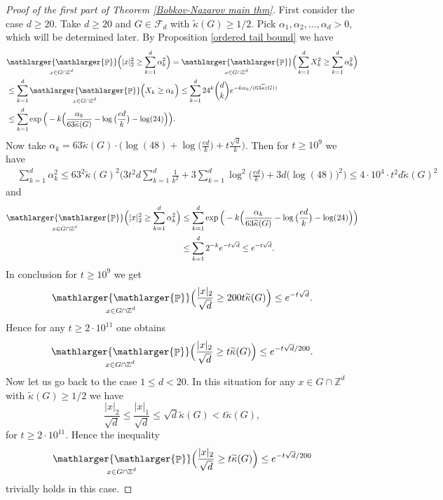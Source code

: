 \documentclass[a4paper,oneside, reqno]{amsart}
\numberwithin{equation}{section}
\theoremstyle{definition}%
\theoremstyle{definition}
\theoremstyle{definition}%
\theoremstyle{definition}
\newcommand{\Pro}{\mathop{\mathbb{P}}}
\newcommand{\Z}{\mathbb{Z}}
\newcommand{\spr}[1]{\underset{_{\substack{#1}}}{\mathlarger{\mathlarger{\Pro}}}}
\begin{document}
\begin{proof}[Proof of the first part of Theorem \ref{Bobkov-Nazarov main thm}]
First consider the case $d \ge 20$.
Take $d \ge 20$ and $G \in \mathcal{F}_d$ with $\widetilde{\kappa}(G) \ge 1/2$. Pick $\alpha_1,\alpha_2,\ldots, \alpha_d >0$, which will be determined later. By Proposition \ref{ordered tail bound} we have 
\begin{align*}
    &\spr{x \in G \cap \Z^d} \Big( |x|_2^2 \ge \sum_{k=1}^d \alpha_k^2 \Big)=\spr{x \in G \cap \Z^d} \Big(\sum_{k=1}^d X_k^2 \ge \sum_{k=1}^d \alpha_k^2 \Big) \\
    &\le \sum_{k=1}^d \spr{x \in G \cap \Z^d} \Big(  X_k \ge  \alpha_k \Big) \le \sum_{k=1}^d 24^k \binom{d}{k} e^{-k \alpha_k/(63\widetilde{\kappa}(G))} \\
    &\le \sum_{k=1}^d  \exp\Big(-k \Big(\frac{\alpha_k}{63\widetilde{\kappa}(G)}-\log\big( \frac{ed}{k}\big)- \log(24) \Big)\Big).
\end{align*}
Now take $\alpha_k=63\widetilde{\kappa}(G) \cdot \Big(\log(48)+ \log( \frac{ed}{k}\big)+t \frac{\sqrt{d}}{k}\Big)$. Then for $t \ge 10^{9}$ we have
\begin{align*}
    &\sum_{k=1}^d \alpha_k^2 \le 63^2\widetilde{\kappa}(G)^2 \bigg(3 t^2 d\sum_{k=1}^d \frac{1}{k^2}+3 \sum_{k=1}^d \log^2\big( \frac{ed}{k} \big)+ 3d\Big(  \log(48)\Big)^2 \bigg) \le 4 \cdot 10^4 \cdot t^2d \widetilde{\kappa}(G)^2
\end{align*}
and
\begin{align*}
   \spr{x \in G \cap \Z^d} \Big( |x|_2^2 \ge \sum_{k=1}^d \alpha_k^2 \Big) &\le \sum_{k=1}^d  \exp\Big(-k \Big(\frac{\alpha_k}{63\widetilde{\kappa}(G)}-\log\big( \frac{ed}{k}\big)- \log(24) \Big)\Big) \\
    &\le \sum_{k=1}^d 2^{-k} e^{-t \sqrt{d}} \le e^{-t \sqrt{d}}.
\end{align*}
 In conclusion for $t \ge 10^9$ we get
\begin{align*}
    \spr{x \in G \cap \Z^d} \Big(\frac{|x|_2}{\sqrt{d}} \ge 200 t \widetilde{\kappa}(G) \Big) \le  e^{-t \sqrt{d}} .
\end{align*}
Hence for any $t \ge 2\cdot10^{11}$ one obtains
\begin{align*}
    \spr{x \in G \cap \Z^d} \Big( \frac{|x|_2}{\sqrt{d}} \ge t \widetilde{\kappa}(G) \Big) \le e^{-t \sqrt{d}/200}.
\end{align*}
Now let us go back to the case $1 \le d <20$. 
In this situation for any $x \in G \cap \Z^d$ with $\widetilde{\kappa}(G) \ge 1/2$ we have
\[
\frac{|x|_2}{\sqrt{d}} \le \frac{|x|_1}{\sqrt{d}} \le \sqrt{d} \widetilde{\kappa}(G)<t \widetilde{\kappa}(G),
\]
for $t \ge 2 \cdot 10^{11}$. Hence the inequality
\begin{align*}
    \spr{x \in G \cap \Z^d} \Big( \frac{|x|_2}{\sqrt{d}} \ge t \widetilde{\kappa}(G) \Big) \le e^{-t \sqrt{d}/200}
\end{align*}
trivially holds in this case.
\end{proof}
\end{document}
